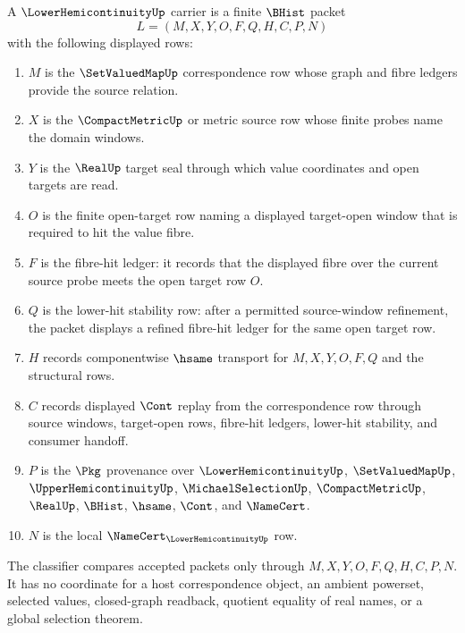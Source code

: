 \begin{definition}
\label{def:lower-hemicontinuity-carrier}
A $\LowerHemicontinuityUp$ carrier is a finite $\BHist$ packet
$$
L=(M,X,Y,O,F,Q,H,C,P,N)
$$
with the following displayed rows:
\begin{enumerate}
\item $M$ is the $\SetValuedMapUp$ correspondence row whose graph and fibre ledgers provide the source relation.
\item $X$ is the $\CompactMetricUp$ or metric source row whose finite probes name the domain windows.
\item $Y$ is the $\RealUp$ target seal through which value coordinates and open targets are read.
\item $O$ is the finite open-target row naming a displayed target-open window that is required to hit the value fibre.
\item $F$ is the fibre-hit ledger: it records that the displayed fibre over the current source probe meets the open target row $O$.
\item $Q$ is the lower-hit stability row: after a permitted source-window refinement, the packet displays a refined fibre-hit ledger for the same open target row.
\item $H$ records componentwise $\hsame$ transport for $M,X,Y,O,F,Q$ and the structural rows.
\item $C$ records displayed $\Cont$ replay from the correspondence row through source windows, target-open rows, fibre-hit ledgers, lower-hit stability, and consumer handoff.
\item $P$ is the $\Pkg$ provenance over $\LowerHemicontinuityUp$, $\SetValuedMapUp$, $\UpperHemicontinuityUp$, $\MichaelSelectionUp$, $\CompactMetricUp$, $\RealUp$, $\BHist$, $\hsame$, $\Cont$, and $\NameCert$.
\item $N$ is the local $\NameCert_{\LowerHemicontinuityUp}$ row.
\end{enumerate}
The classifier compares accepted packets only through $M,X,Y,O,F,Q,H,C,P,N$. It has no coordinate for a host correspondence object, an ambient powerset, selected values, closed-graph readback, quotient equality of real names, or a global selection theorem.
\end{definition}

